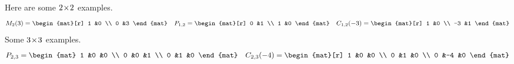 \documentclass[10pt,t]{beamer}
\begin{document}
\begin{frame}
\df[df:ElementaryReductionMatrices]
\pause
\ex
Here are some $2 \! \times \! 2$ examples.
\begin{equation*}
  M_{2}(3)=
  \begin{mat}[r]
    1  &0 \\
    0  &3
  \end{mat}
  \quad
  P_{1,2}=
  \begin{mat}[r]
    0  &1 \\
    1  &0
  \end{mat}
  \quad
  C_{1,2}(-3)=
  \begin{mat}[r]
    1  &0 \\
    -3 &1
  \end{mat}
\end{equation*}
\pause
\ex
Some $3 \! \times \! 3$ examples.
\begin{equation*}
  P_{2,3}=
  \begin{mat}
    1 &0 &0 \\
    0 &0 &1 \\
    0 &1 &0
  \end{mat}
  \quad
  C_{2,3}(-4)=
  \begin{mat}[r]
    1 &0  &0 \\
    0 &1  &0 \\
    0 &-4 &0
  \end{mat}
\end{equation*}
\end{frame}
\end{document}
